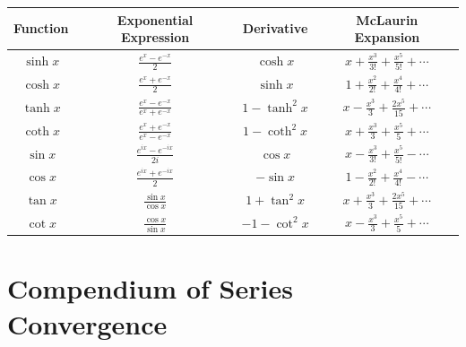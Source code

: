 \documentclass{article}
\begin{document}
\begin{center}
    \begin{tabular}{|c|c|c|c|}
        \hline
        \textbf{Function} & \textbf{Exponential Expression}     & \textbf{Derivative} & \textbf{McLaurin Expansion}                    \\
        \hline
        $\sinh{x}$        & $\frac{e^x - e^{-x}}{2}$            & $\cosh{x}$          & $x + \frac{x^3}{3!} + \frac{x^5}{5!} + \cdots$ \\
        \hline
        $\cosh{x}$        & $\frac{e^x + e^{-x}}{2}$            & $\sinh{x}$          & $1 + \frac{x^2}{2!} + \frac{x^4}{4!} + \cdots$ \\
        \hline
        $\tanh{x}$        & $\frac{e^x - e^{-x}}{e^x + e^{-x}}$ & $1 - \tanh^2{x}$    & $x - \frac{x^3}{3} + \frac{2x^5}{15} + \cdots$ \\
        \hline
        $\coth{x}$        & $\frac{e^x + e^{-x}}{e^x - e^{-x}}$ & $1 - \coth^2{x}$    & $x + \frac{x^3}{3} + \frac{x^5}{5} + \cdots$   \\
        \hline
        $\sin{x}$         & $\frac{e^{ix} - e^{-ix}}{2i}$       & $\cos{x}$           & $x - \frac{x^3}{3!} + \frac{x^5}{5!} - \cdots$ \\
        \hline
        $\cos{x}$         & $\frac{e^{ix} + e^{-ix}}{2}$        & $-\sin{x}$          & $1 - \frac{x^2}{2!} + \frac{x^4}{4!} - \cdots$ \\
        \hline
        $\tan{x}$         & $\frac{\sin{x}}{\cos{x}}$           & $1 + \tan^2{x}$     & $x + \frac{x^3}{3} + \frac{2x^5}{15} + \cdots$ \\
        \hline
        $\cot{x}$         & $\frac{\cos{x}}{\sin{x}}$           & $-1 - \cot^2{x}$    & $x - \frac{x^3}{3} + \frac{x^5}{5} + \cdots$   \\
        \hline
    \end{tabular}
\end{center}

\newpage

\section{Compendium of Series Convergence}
\end{document}
